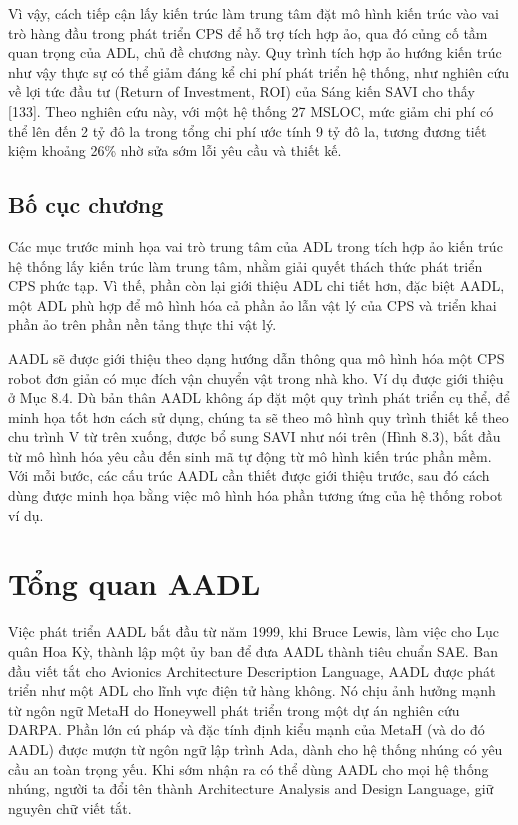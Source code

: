 Vì vậy, cách tiếp cận lấy kiến trúc làm trung tâm đặt mô hình kiến trúc vào vai trò hàng đầu trong phát triển CPS để hỗ trợ tích hợp ảo, qua đó củng cố tầm quan trọng của ADL, chủ đề chương này. Quy trình tích hợp ảo hướng kiến trúc như vậy thực sự có thể giảm đáng kể chi phí phát triển hệ thống, như nghiên cứu về lợi tức đầu tư (Return of Investment, ROI) của Sáng kiến SAVI cho thấy [133]. Theo nghiên cứu này, với một hệ thống 27 MSLOC, mức giảm chi phí có thể lên đến 2 tỷ đô la trong tổng chi phí ước tính 9 tỷ đô la, tương đương tiết kiệm khoảng 26\% nhờ sửa sớm lỗi yêu cầu và thiết kế.


\subsection{Bố cục chương}
Các mục trước minh họa vai trò trung tâm của ADL trong tích hợp ảo kiến trúc hệ thống lấy kiến trúc làm trung tâm, nhằm giải quyết thách thức phát triển CPS phức tạp. Vì thế, phần còn lại giới thiệu ADL chi tiết hơn, đặc biệt AADL, một ADL phù hợp để mô hình hóa cả phần ảo lẫn vật lý của CPS và triển khai phần ảo trên phần nền tảng thực thi vật lý.

AADL sẽ được giới thiệu theo dạng hướng dẫn thông qua mô hình hóa một CPS robot đơn giản có mục đích vận chuyển vật trong nhà kho. Ví dụ được giới thiệu ở Mục 8.4. Dù bản thân AADL không áp đặt một quy trình phát triển cụ thể, để minh họa tốt hơn cách sử dụng, chúng ta sẽ theo mô hình quy trình thiết kế theo chu trình V từ trên xuống, được bổ sung SAVI như nói trên (Hình 8.3), bắt đầu từ mô hình hóa yêu cầu đến sinh mã tự động từ mô hình kiến trúc phần mềm.
Với mỗi bước, các cấu trúc AADL cần thiết được giới thiệu trước, sau đó cách dùng được minh họa bằng việc mô hình hóa phần tương ứng của hệ thống robot ví dụ.

\section{Tổng quan AADL}
Việc phát triển AADL bắt đầu từ năm 1999, khi Bruce Lewis, làm việc cho Lục quân Hoa Kỳ, thành lập một ủy ban để đưa AADL thành tiêu chuẩn SAE. Ban đầu viết tắt cho Avionics Architecture Description Language, AADL được phát triển như một ADL cho lĩnh vực điện tử hàng không. Nó chịu ảnh hưởng mạnh từ ngôn ngữ MetaH do Honeywell phát triển trong một dự án nghiên cứu DARPA. Phần lớn cú pháp và đặc tính định kiểu mạnh của MetaH (và do đó AADL) được mượn từ ngôn ngữ lập trình Ada, dành cho hệ thống nhúng có yêu cầu an toàn trọng yếu. Khi sớm nhận ra có thể dùng AADL cho mọi hệ thống nhúng, người ta đổi tên thành Architecture Analysis and Design Language, giữ nguyên chữ viết tắt.

